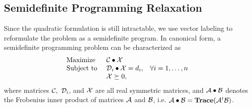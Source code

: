\documentclass{ieee}
\def\A{{\cal A}}
\def\B{{\cal B}}
\def\C{{\cal C}}
\def\D{{\cal D}}
\def\X{{\cal X}}
\begin{document}
\subsection{Semidefinite Programming Relaxation} 
\label{sec:semidefinite}
\vspace{-0.1in}
Since the quadratic formulation is still intractable, we use vector
labeling to reformulate the problem as a semidefinite program.  In
canonical form, a semidefinite programming problem can be
characterized as
$$
\begin{array}{lll}
{\rm Maximize}       & \C \bullet \X         &  \\
{\rm Subject\ to\ }   & \D_i \bullet \X=d_i,  & \forall i=1,\ldots,n  \\
                     & \X \succeq 0,         &
\end{array}
$$
where matrices $\C,\ \D_i$, and $\X$ are all real symmetric
matrices, and $\A \bullet \B$ denotes the Frobenius inner product of
matrices $\A$ and $\B$, i.e. $\A \bullet \B= \mathbf{Trace}(\A^t \B)$.
\end{document}
